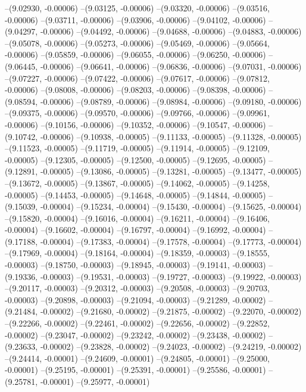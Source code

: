 --(9.02930, -0.00006)
--(9.03125, -0.00006)
--(9.03320, -0.00006)
--(9.03516, -0.00006)
--(9.03711, -0.00006)
--(9.03906, -0.00006)
--(9.04102, -0.00006)
--(9.04297, -0.00006)
--(9.04492, -0.00006)
--(9.04688, -0.00006)
--(9.04883, -0.00006)
--(9.05078, -0.00006)
--(9.05273, -0.00006)
--(9.05469, -0.00006)
--(9.05664, -0.00006)
--(9.05859, -0.00006)
--(9.06055, -0.00006)
--(9.06250, -0.00006)
--(9.06445, -0.00006)
--(9.06641, -0.00006)
--(9.06836, -0.00006)
--(9.07031, -0.00006)
--(9.07227, -0.00006)
--(9.07422, -0.00006)
--(9.07617, -0.00006)
--(9.07812, -0.00006)
--(9.08008, -0.00006)
--(9.08203, -0.00006)
--(9.08398, -0.00006)
--(9.08594, -0.00006)
--(9.08789, -0.00006)
--(9.08984, -0.00006)
--(9.09180, -0.00006)
--(9.09375, -0.00006)
--(9.09570, -0.00006)
--(9.09766, -0.00006)
--(9.09961, -0.00006)
--(9.10156, -0.00006)
--(9.10352, -0.00006)
--(9.10547, -0.00006)
--(9.10742, -0.00006)
--(9.10938, -0.00005)
--(9.11133, -0.00005)
--(9.11328, -0.00005)
--(9.11523, -0.00005)
--(9.11719, -0.00005)
--(9.11914, -0.00005)
--(9.12109, -0.00005)
--(9.12305, -0.00005)
--(9.12500, -0.00005)
--(9.12695, -0.00005)
--(9.12891, -0.00005)
--(9.13086, -0.00005)
--(9.13281, -0.00005)
--(9.13477, -0.00005)
--(9.13672, -0.00005)
--(9.13867, -0.00005)
--(9.14062, -0.00005)
--(9.14258, -0.00005)
--(9.14453, -0.00005)
--(9.14648, -0.00005)
--(9.14844, -0.00005)
--(9.15039, -0.00004)
--(9.15234, -0.00004)
--(9.15430, -0.00004)
--(9.15625, -0.00004)
--(9.15820, -0.00004)
--(9.16016, -0.00004)
--(9.16211, -0.00004)
--(9.16406, -0.00004)
--(9.16602, -0.00004)
--(9.16797, -0.00004)
--(9.16992, -0.00004)
--(9.17188, -0.00004)
--(9.17383, -0.00004)
--(9.17578, -0.00004)
--(9.17773, -0.00004)
--(9.17969, -0.00004)
--(9.18164, -0.00004)
--(9.18359, -0.00003)
--(9.18555, -0.00003)
--(9.18750, -0.00003)
--(9.18945, -0.00003)
--(9.19141, -0.00003)
--(9.19336, -0.00003)
--(9.19531, -0.00003)
--(9.19727, -0.00003)
--(9.19922, -0.00003)
--(9.20117, -0.00003)
--(9.20312, -0.00003)
--(9.20508, -0.00003)
--(9.20703, -0.00003)
--(9.20898, -0.00003)
--(9.21094, -0.00003)
--(9.21289, -0.00002)
--(9.21484, -0.00002)
--(9.21680, -0.00002)
--(9.21875, -0.00002)
--(9.22070, -0.00002)
--(9.22266, -0.00002)
--(9.22461, -0.00002)
--(9.22656, -0.00002)
--(9.22852, -0.00002)
--(9.23047, -0.00002)
--(9.23242, -0.00002)
--(9.23438, -0.00002)
--(9.23633, -0.00002)
--(9.23828, -0.00002)
--(9.24023, -0.00002)
--(9.24219, -0.00002)
--(9.24414, -0.00001)
--(9.24609, -0.00001)
--(9.24805, -0.00001)
--(9.25000, -0.00001)
--(9.25195, -0.00001)
--(9.25391, -0.00001)
--(9.25586, -0.00001)
--(9.25781, -0.00001)
--(9.25977, -0.00001)
